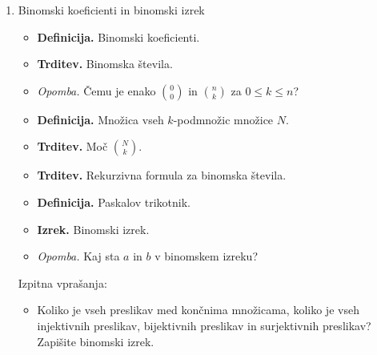 \begin{enumerate}
    \item Binomski koeficienti in binomski izrek
    \begin{itemize}
        \item \colorbox{purple!30}{\textbf{Definicija.}} Binomski koeficienti.
        \item \colorbox{blue!30}{\textbf{Trditev.}} Binomska števila.
        \item \colorbox{yellow!30}{\emph{Opomba.}} Čemu je enako \(\binom{0}{0}\) in \(\binom{n}{k}\) za \(0 \leq k \leq n\)?
        \item \colorbox{purple!30}{\textbf{Definicija.}} Množica vseh \(k\)-podmnožic množice \(N\).
        \item \colorbox{blue!30}{\textbf{Trditev.}} Moč \(\binom{N}{k}\).
        \item \colorbox{blue!30}{\textbf{Trditev.}} Rekurzivna formula za binomska števila.
        \item \colorbox{purple!30}{\textbf{Definicija.}} Paskalov trikotnik.
        \item \colorbox{blue!30}{\textbf{Izrek.}} Binomski izrek. 
        \item \colorbox{yellow!30}{\emph{Opomba.}} Kaj sta \(a\) in \(b\) v binomskem izreku?
    \end{itemize}

    Izpitna vprašanja:
    \begin{itemize}
        \item Koliko je vseh preslikav med končnima množicama, koliko je vseh injektivnih preslikav, bijektivnih preslikav in surjektivnih preslikav? Zapišite binomski izrek.
    \end{itemize}
\end{enumerate}
